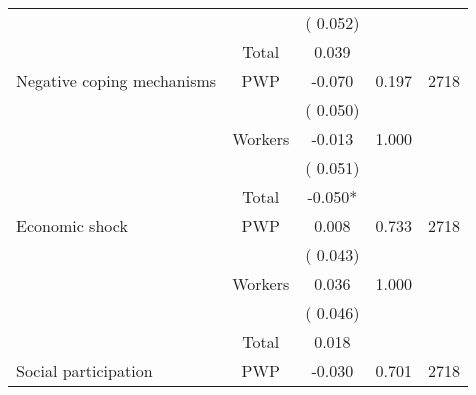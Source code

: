 \begin{tabular}{l*{4}{c}}
                               &                               &       (       0.052)                     & &                                                                             \\ 
\cmidrule{2-3}
                               &       Total           &              0.039                 &    &                                               \\ 
\cmidrule{2-3}
 Negative coping mechanisms                 &       PWP     &             -0.070               &       0.197    & 2718                              \\ 
                               &                               &       (       0.050)                     & &                                                                             \\ 
                               &       Workers         &             -0.013               &        1.000   &                                               \\ 
                               &                               &       (       0.051)                     & &                                                                             \\ 
\cmidrule{2-3}
                               &       Total           &             -0.050*                 &    &                                               \\ 
\cmidrule{2-3}
 Economic shock                 &       PWP     &              0.008               &        0.733   & 2718                              \\ 
                               &                               &       (       0.043)                     & &                                                                             \\ 
                               &       Workers         &              0.036               &        1.000   &                                               \\ 
                               &                               &       (       0.046)                     & &                                                                             \\ 
\cmidrule{2-3}
                               &       Total           &              0.018                 &    &                                               \\ 
\cmidrule{2-3}
 Social participation                 &       PWP     &             -0.030               &        0.701   & 2718                              \\ 

\end{tabular}
